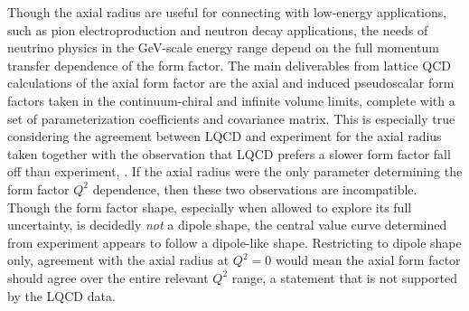 

Though the axial  radius are useful for connecting with low-energy applications,
 such as pion electroproduction and neutron decay applications,
 the needs of neutrino physics in the GeV-scale energy range depend
 on the full momentum transfer dependence of the form factor.
The main deliverables from lattice QCD calculations of the axial form factor
 are the axial and induced pseudoscalar form factors taken in the continuum-chiral
 and infinite volume limits, complete with a set of parameterization coefficients
 and covariance matrix.
This is especially true considering the agreement between LQCD and experiment
 for the axial radius taken together with the observation that
 LQCD prefers a slower form factor fall off than experiment,
 .
If the axial radius were the only parameter determining the form factor $Q^2$ dependence,
 then these two observations are incompatible.
Though the form factor shape, especially when allowed to explore its full uncertainty,
 is decidedly \emph{not} a dipole shape, the central value curve determined
 from experiment appears to follow a dipole-like shape.
Restricting to dipole shape only, agreement with the axial radius at $Q^2=0$
 would mean the axial form factor should agree over the entire relevant $Q^2$ range,
 a statement that is not supported by the LQCD data.

